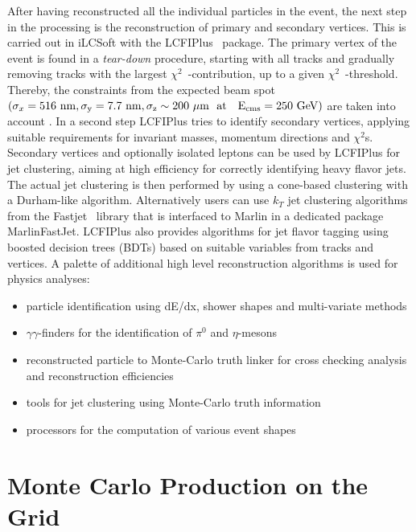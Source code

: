 After having reconstructed all the individual particles in the event, the next step in the processing is the reconstruction of
primary and secondary vertices. This is carried out in iLCSoft with the LCFIPlus~\cite{Suehara:2015ura} package.
The primary vertex of the event is found in a \emph{tear-down} procedure, starting with all tracks and gradually removing tracks with
the largest $\chi^2$~-contribution, up to a given  $\chi^2$~-threshold. Thereby, the constraints from the expected beam spot
$(\sigma_x=516~\rm{nm}, \sigma_y=7.7~\rm{nm},\sigma_z \sim 200~\mu\rm{m}~~\rm{at}~~~E_{cms}=250~\rm{GeV})$ are taken into account .
In a second step LCFIPlus tries to identify secondary vertices, applying suitable requirements for invariant masses, momentum directions
and $\chi^2$s. Secondary vertices and optionally isolated leptons can be used by LCFIPlus for jet clustering, aiming at high efficiency for correctly
identifying heavy flavor jets. The actual jet clustering is then performed by using a cone-based clustering with a Durham-like algorithm.
Alternatively users can use $k_T$ jet clustering algorithms from the Fastjet~\cite{Cacciari:2006sm} library that is interfaced to Marlin in a
dedicated package MarlinFastJet. LCFIPlus also provides algorithms for jet flavor tagging using boosted decision trees (BDTs) based on suitable
variables from tracks and vertices. A palette of additional high level reconstruction algorithms is used for physics analyses:
\begin{itemize}
\item particle identification using dE/dx, shower shapes and multi-variate methods
\item $\gamma\gamma$-finders for the identification of $\pi^0$ and $\eta$-mesons
\item reconstructed particle to Monte-Carlo truth linker for cross checking analysis and reconstruction efficiencies
\item tools for jet clustering using Monte-Carlo truth information
\item processors for the computation of various event shapes
\end{itemize}



\section{\label{sec:monte-carlo} Monte Carlo Production on the Grid}

